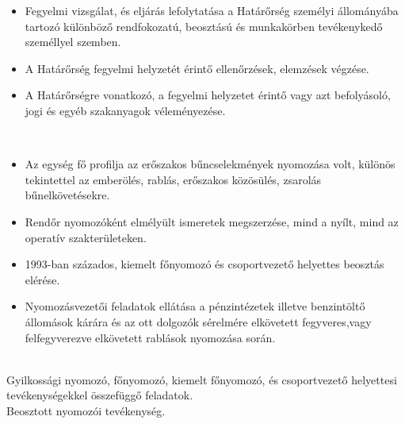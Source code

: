 \documentclass[10pt,a4paper,ragged2e,withhyper]{AltaCV/altacv}
\begin{document}
\begin{paracol}{1}
		\begin{itemize}[leftmargin=.25in]
			\item Fegyelmi vizsgálat, és eljárás lefolytatása a Határőrség személyi állományába tartozó különböző rendfokozatú, beosztású és munkakörben tevékenykedő személlyel szemben. 
			\item A Határőrség fegyelmi helyzetét érintő ellenőrzések, elemzések végzése.
			\item A Határőrségre vonatkozó, a fegyelmi helyzetet érintő vagy azt befolyásoló, jogi és egyéb szakanyagok
			véleményezése.
		\end{itemize}\\
		\divider
		\begin{itemize}[leftmargin=.25in]
			\item Az egység fő profilja az erőszakos bűncselekmények nyomozása volt, különös tekintettel az emberölés,
			rablás, erőszakos közösülés, zsarolás bűnelkövetésekre.
			\item Rendőr nyomozóként elmélyült ismeretek megszerzése, mind a nyílt, mind az operatív szakterületeken. 
			\item 1993-ban százados, kiemelt főnyomozó és csoportvezető helyettes beosztás elérése.
			\item Nyomozásvezetői feladatok ellátása a	pénzintézetek illetve benzintöltő állomások kárára és az ott dolgozók sérelmére elkövetett fegyveres,vagy felfegyverezve elkövetett rablások nyomozása során.
		\end{itemize}\\
		\divider
		Gyilkossági nyomozó, főnyomozó, kiemelt főnyomozó, és csoportvezető helyettesi tevékenységekkel összefüggő feladatok.\\
		\divider		
		Beosztott nyomozói tevékenység.\\
		\divider		
	\end{paracol}		
\end{document}
